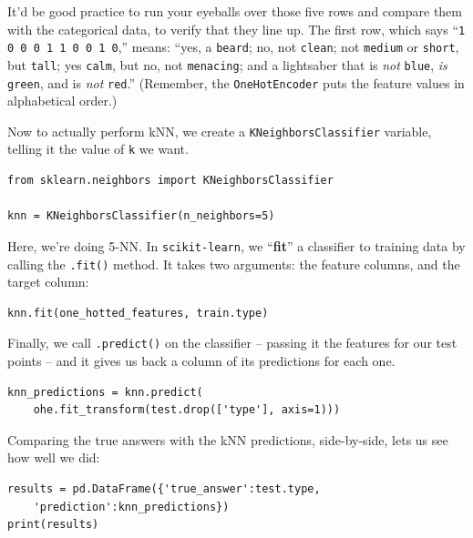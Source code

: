 It'd be good practice to run your eyeballs over those five rows and compare
them with the categorical data, to verify that they line up. The first row,
which says ``\texttt{1 0 0 0 1 1 0 0 1 0},'' means: ``yes, a \texttt{beard};
no, not \texttt{clean}; not \texttt{medium} or \texttt{short}, but
\texttt{tall}; yes \texttt{calm}, but no, not \texttt{menacing}; and a
lightsaber that is \textit{not} \texttt{blue}, \textit{is} \texttt{green}, and
is \textit{not} \texttt{red}.'' (Remember, the \texttt{OneHotEncoder} puts the
feature values in alphabetical order.)


Now to actually perform kNN, we create a \texttt{KNeighborsClassifier}
variable, telling it the value of \texttt{k} we want.

\begin{Verbatim}[fontsize=\small,samepage=true,frame=single,framesep=3mm]
from sklearn.neighbors import KNeighborsClassifier

knn = KNeighborsClassifier(n_neighbors=5)
\end{Verbatim}


Here, we're doing 5-NN. In \texttt{scikit-learn}, we ``\textbf{fit}'' a
classifier to training data by calling the \texttt{.fit()} method. It takes two
arguments: the feature columns, and the target column:

\begin{Verbatim}[fontsize=\small,samepage=true,frame=single,framesep=3mm]
knn.fit(one_hotted_features, train.type)
\end{Verbatim}

Finally, we call \texttt{.predict()} on the classifier -- passing it the
features for our test points -- and it gives us back a column of its
predictions for each one.

\begin{Verbatim}[fontsize=\small,samepage=true,frame=single,framesep=3mm]
knn_predictions = knn.predict(
    ohe.fit_transform(test.drop(['type'], axis=1)))
\end{Verbatim}

Comparing the true answers with the kNN predictions, side-by-side, lets us see
how well we did:

\begin{Verbatim}[fontsize=\footnotesize,samepage=true,frame=single,framesep=3mm]
results = pd.DataFrame({'true_answer':test.type,
    'prediction':knn_predictions})
print(results)
\end{Verbatim}
\vspace{-.2in}

